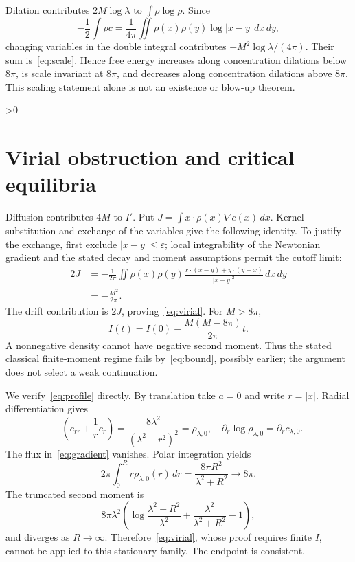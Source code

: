 \documentclass[10pt]{article}
\providecommand{\CRevisionRound}{2}
\begin{document}
Dilation contributes $2M\log\lambda$ to $\int\rho\log\rho$.  Since
\[
 -\frac12\int\rho c
 =\frac1{4\pi}\iint\rho(x)\rho(y)\log|x-y|\,dx\,dy,
\]
changing variables in the double integral contributes
$-M^2\log\lambda/(4\pi)$.  Their sum is~\eqref{eq:scale}.  Hence free energy increases
along concentration dilations below $8\pi$, is scale invariant at $8\pi$,
and decreases along concentration dilations above $8\pi$.  This
scaling statement alone is not an existence or blow-up theorem.

\ifnum\CRevisionRound>0
\section{Virial obstruction and critical equilibria}

Diffusion contributes $4M$ to $I'$.  Put
$J=\int x\cdot\rho(x)\nabla c(x)\,dx$.  Kernel substitution and exchange of
the variables give the following identity.  To justify the exchange, first
exclude $|x-y|\le\varepsilon$; local integrability of the Newtonian gradient
and the stated decay and moment assumptions permit the cutoff limit:
\begin{align}
 2J&=-\frac1{2\pi}\iint\rho(x)\rho(y)
 \frac{x\cdot(x-y)+y\cdot(y-x)}{|x-y|^2}\,dx\,dy\\
 &=-\frac{M^2}{2\pi}.
\end{align}
The drift contribution is $2J$, proving~\eqref{eq:virial}.  For $M>8\pi$,
\[
 I(t)=I(0)-\frac{M(M-8\pi)}{2\pi}t.
\]
A nonnegative density cannot have negative second moment.  Thus the stated
classical finite-moment regime fails by~\eqref{eq:bound}, possibly earlier; the argument
does not select a weak continuation.

We verify~\eqref{eq:profile} directly.  By translation take $a=0$ and write $r=|x|$.
Radial differentiation gives
\begin{equation}
 -\left(c_{rr}+\frac1r c_r\right)
 =\frac{8\lambda^2}{(\lambda^2+r^2)^2}=\rho_{\lambda,0},
 \quad \partial_r\log\rho_{\lambda,0}=\partial_r c_{\lambda,0}. \label{eq:stationary}
\end{equation}
The flux in~\eqref{eq:gradient} vanishes.  Polar integration yields
\begin{equation}
 2\pi\int_0^R r\rho_{\lambda,0}(r)\,dr
 =\frac{8\pi R^2}{\lambda^2+R^2}\longrightarrow8\pi. \label{eq:mass}
\end{equation}
The truncated second moment is
\begin{equation}
 8\pi\lambda^2\left(
 \log\frac{\lambda^2+R^2}{\lambda^2}
 +\frac{\lambda^2}{\lambda^2+R^2}-1\right),          \label{eq:moment}
\end{equation}
and diverges as $R\to\infty$.  Therefore~\eqref{eq:virial}, whose proof requires finite
$I$, cannot be applied to this stationary family.  The endpoint is consistent.
\fi
\end{document}
